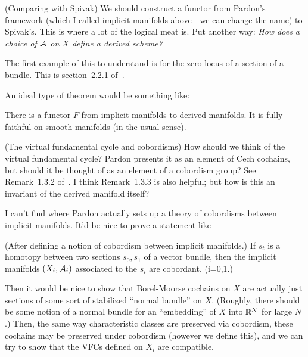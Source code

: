			\enumd
	\item (Comparing with Spivak)
		We should construct a functor from Pardon's framework (which I called implicit manifolds above---we can change the name) to Spivak's. This is where a lot of the logical meat is. Put another way: {\em How does a choice of $\mathcal A$ on $X$ define a derived scheme?}
			\enum
				\item
					The first example of this to understand is for the zero locus of a section of a bundle. This is section~2.2.1 of~\cite{pardon}.
				\item
					An ideal type of theorem would be something like:
						\begin{theorem}
						There is a functor $F$ from implicit manifolds to derived manifolds. It is fully faithful on smooth manifolds (in the usual sense).
						\end{theorem}
			\enumd
	\item (The virtual fundamental cycle and cobordisms)
		How should we think of the virtual fundamental cycle? Pardon presents it as an element of Cech cochains, but should it be thought of as an element of a cobordism group? See Remark~1.3.2 of~\cite{pardon}. I think Remark~1.3.3 is also helpful; but how is this an invariant of the derived manifold itself?
			\enum
				\item
					I can't find where Pardon actually sets up a theory of cobordisms between implicit manifolds. It'd be nice to prove a statement like
					\begin{theorem}
					(After defining a notion of cobordism between implicit manifolds.) If $s_t$ is a homotopy between two sections $s_0, s_1$ of a vector bundle, then the implicit manifolds $(X_i, \mathcal A_i)$ associated to the $s_i$ are cobordant. (i=0,1.)
					\end{theorem}
				\item
					Then it would be nice to show that Borel-Moorse cochains on $X$ are actually just sections of some sort of stabilized ``normal bundle'' on $X$. (Roughly, there should be some notion of a normal bundle for an ``embedding'' of $X$ into $\mathbb R^N$ for large $N$.) Then, the same way characteristic classes are preserved via cobordism, these cochains may be preserved under cobordism (however we define this), and we can try to show that the VFCs defined on $X_i$ are compatible.
